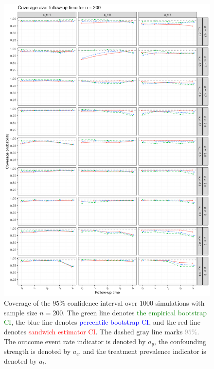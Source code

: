 \documentclass[pdflatex,sn-vancouver-ay]{sn-jnl}%
\theoremstyle{thmstyleone}%
\theoremstyle{thmstyletwo}%
\theoremstyle{thmstylethree}%
\begin{document}
\begin{appendices}
\begin{figure}[H]
\centering
\includegraphics[height=0.95\textheight]{plots/plots_coverage200.png}
\caption{Coverage of the $95\%$ confidence interval over $1000$ simulations with sample size $n = 200$. The green line denotes \textcolor{green}{the empirical bootstrap CI}, the blue line denotes \textcolor{blue}{percentile bootstrap CI}, and the red line denotes \textcolor{red}{sandwich estimator CI}. The dashed gray line marks \textcolor{darkgray}{$95\%$}. The outcome event rate indicator is denoted by $a_y$, the confounding strength is denoted by $a_c$, and the treatment prevalence indicator is denoted by $a_t$.}\label{plt:coverage200}
\end{figure}

\newpage


\end{appendices}
\end{document}
